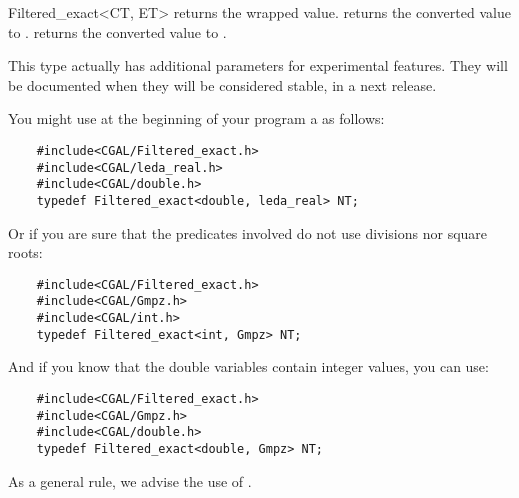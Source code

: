 \begin{ccRefClass}{Filtered_exact<CT, ET>}
 {returns the wrapped value.}
 {returns the converted value to .}
 {returns the converted value
                                             to .}


This type actually has additional parameters for experimental features.  They
will be documented when they will be considered stable, in a next release.

\ccExample

You might use at the beginning of your program a  as follows:

\begin{verbatim}
    #include<CGAL/Filtered_exact.h>
    #include<CGAL/leda_real.h>
    #include<CGAL/double.h>
    typedef Filtered_exact<double, leda_real> NT;
\end{verbatim}

Or if you are sure that the predicates involved do not use divisions nor
square roots:

\begin{verbatim}
    #include<CGAL/Filtered_exact.h>
    #include<CGAL/Gmpz.h>
    #include<CGAL/int.h>
    typedef Filtered_exact<int, Gmpz> NT;
\end{verbatim}

And if you know that the double variables contain integer values, you can
use:

\begin{verbatim}
    #include<CGAL/Filtered_exact.h>
    #include<CGAL/Gmpz.h>
    #include<CGAL/double.h>
    typedef Filtered_exact<double, Gmpz> NT;
\end{verbatim}

As a general rule, we advise the use of
.

% 



\end{ccRefClass}
